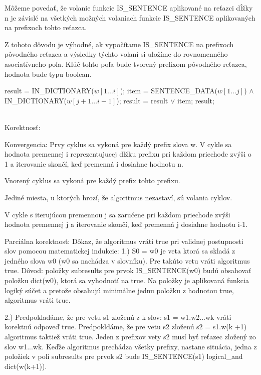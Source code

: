 \documentclass[paper=a4, fontsize=11pt]{scrartcl} %
\numberwithin{equation}{section} %
\numberwithin{figure}{section} %
\numberwithin{table}{section} %
\begin{document}
Môžeme povedať, že volanie funkcie IS\_SENTENCE aplikované na reťazci dĺžky n je závislé na všetkých možných volaniach funkcie IS\_SENTENCE aplikovaných na prefixoch tohto reťazca.

Z tohoto dôvodu je výhodné, ak vypočítame IS\_SENTENCE na prefixoch pôvodného reťazca a výsledky týchto volaní si uložíme do rovnomenného asociatívneho poľa.
Kľúč tohto poľa bude tvorený prefixom pôvodného reťazca, hodnota bude typu boolean.


\begin{algorithmic}[1]
        \State result = IN\_DICTIONARY($w[1 \dots i]$);
                \State item = SENTENCE\_DATA($w[1 \dots j]$) $\wedge$ IN\_DICTIONARY($w[j + 1 \dots i - 1]$);
		\State result = result $\vee$ item;
        \EndFor
	\EndFor
	\State \Return result;
    \EndFunction	
\end{algorithmic}
\ \\
 
Korektnosť: 

Konvergencia:
Prvy cyklus sa vykoná pre každý prefix slova w.
V cykle sa hodnota premennej i reprezentujucej dlžku prefixu pri každom priechode zvýši o 1 a iterovanie skončí, keď premenná i dosiahne hodnotu n.

Vnorený cyklus sa vykoná pre každý prefix tohto prefixu. 

Jediné miesta, u ktorých hrozí, že algoritmus nezastaví, sú volania cyklov.

V cykle s iterujúcou premennou j sa zaručene pri každom priechode zvýši hodnota premennej j a iterovanie skončí, keď premenná j dosiahne hodnotu i-1.

Parciálna korektnosť:
Dôkaz, že algoritmus vráti true pri validnej postupnosti slov pomocou matematickej indukcie:
1.) S0 = w0 je veta ktorá sa skladá z jedného slova w0 (w0 sa nachádza v slovníku). Pre takúto vetu vráti algoritmus true. Dôvod: položky subresults pre prvok IS\_SENTENCE(w0) budú obsahovať položku dict(w0), ktorá sa vyhodnotí na true. Na položky je aplikovaná funkcia logiký súčet a pretože obsahujú minimálne jednu položku z hodnotou true, algoritmus vráti true.
	
2.) Predpokladáme, že pre vetu s1 zloženú z k slov: s1 = w1.w2...wk vráti korektnú odpoveď true.
	Predpokldáme, že pre vetu s2 zloženú s2 = s1.w(k +1) algoritmus taktiež vráti true.
	Jeden z prefixov vety s2 musí byť reťazec zložený zo slov w1...wk.
	Keďže algoritmus prechádza všetky prefixy, nastane situácia, jedna z položiek v poli subresults
	pre prvok s2 bude IS\_SENTENCE(s1) logical\_and dict(w(k+1)).
	
\end{document}

